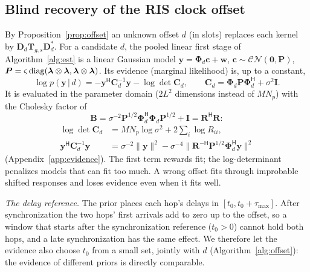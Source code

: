 \subsection{Blind recovery of the RIS clock offset}\label{sec:timing}
By Proposition~\ref{prop:offset} an unknown offset $d$ (in slots) replaces each kernel by
$\bm D_d\bm T_{g,s}\bm D_d^{*}$. For a candidate $d$, the pooled linear first stage of
Algorithm~\ref{alg:est} is a linear Gaussian model $\bm y=\bm\Phi_d\bm c+\bm w$,
$\bm c\sim\mathcal{CN}(\bm 0,\bm P)$, $\bm P=\varsigma\operatorname{diag}(\bm\lambda\otimes\bm\lambda,\bm\lambda\otimes\bm\lambda)$.
Its evidence (marginal likelihood) is, up to a constant,
\begin{equation}
\log p(\bm y\,|\,d)=-\bm y^{\mathsf H}\bm C_d^{-1}\bm y-\log\det\bm C_d,\qquad
\bm C_d=\bm\Phi_d\bm P\bm\Phi_d^{\mathsf H}+\sigma^2\bm I.
\label{eq:evidence}
\end{equation}
It is evaluated in the parameter domain ($2L^2$ dimensions instead of $MN_p$) with the Cholesky factor of
\[\bm B=\sigma^{-2}\bm P^{1/2}\bm\Phi_d^{\mathsf H}\bm\Phi_d\bm P^{1/2}+\bm I=\bm R^{\mathsf H}\bm R:\]
\begin{align*}
\log\det\bm C_d&=MN_p\log\sigma^2+2\textstyle\sum_i\log R_{ii},\\
\bm y^{\mathsf H}\bm C_d^{-1}\bm y&=\sigma^{-2}\|\bm y\|^2-\sigma^{-4}\|\bm R^{-\mathsf H}\bm P^{1/2}\bm\Phi_d^{\mathsf H}\bm y\|^2
\end{align*}
(Appendix~\ref{app:evidence}). The first term rewards fit; the log-determinant penalizes
models that can fit too much. A wrong offset fits through improbable shifted responses
and loses evidence even when it fits well.

\emph{The delay reference.} The prior places each hop's delays in $[t_0,t_0+\tau_{\max}]$. After
synchronization the two hops' first arrivals add to zero up to the offset, so a window that starts after the
synchronization reference ($t_0>0$) cannot hold both hops, and a late synchronization has the same effect.
We therefore let the evidence also choose $t_0$ from a small set, jointly with $d$ (Algorithm~\ref{alg:offset}):
the evidence of different priors is directly comparable.

